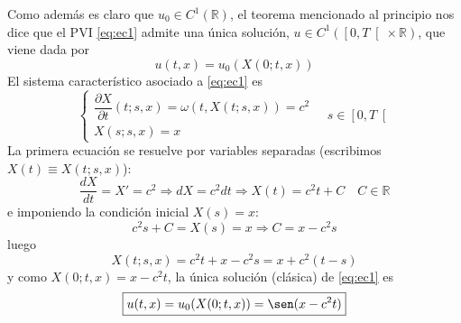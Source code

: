 \documentclass[12pt]{article}
\newcommand{\R}{\mathbb{R}}
\begin{document}
\begin{ejercicio}
\begin{itemize}
        \end{itemize}
        Como además es claro que $u_0 \in C^1(\R)$, el teorema mencionado al principio nos dice que el PVI \eqref{eq:ec1} admite una única solución, 
        $u \in C^1(\left[0, T \right[ \times \R)$, que viene dada por 
        $$u(t,x) = u_0(X(0;t,x))$$ 
        El sistema característico asociado a \eqref{eq:ec1} es 
        \begin{equation*}
            \begin{cases}
                \dfrac{\partial X}{\partial t}(t;s,x)
                =\omega(t,X(t;s,x)) = c^2\\[6pt]
                X(s;s,x)=x
            \end{cases}\quad s \in \left[0, T \right[
        \end{equation*}
        La primera ecuación se resuelve por variables separadas (escribimos $X(t) \equiv X(t;s,x)$):
        $$\dfrac{dX}{dt} = X' = c^2 \Longrightarrow dX = c^2 dt \Longrightarrow X(t) = c^2 t + C \quad C \in \R$$
        e imponiendo la condición inicial $X(s) = x$:
        $$c^2 s + C = X(s) = x \Longrightarrow C = x - c^2 s$$
        luego
        $$X(t;s,x) = c^2 t + x - c^2 s = x + c^2(t-s)$$
        y como $X(0;t,x) = x - c^2t$, la única solución (clásica) de \eqref{eq:ec1} es
        $$\boxed{u(t,x) = u_0(X(0;t,x)) = \sen(x - c^2t)}$$
    \end{ejercicio}
\end{document}
